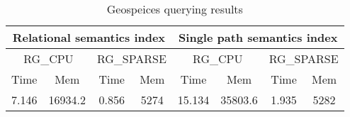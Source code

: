 {\setlength{\tabcolsep}{0.4em}
\begin{table*}[h]
\caption{Geospeices querying results}
\label{tbl:tableGeoRelationalPathIndex}
\begin{tabular}{| c  c | c  c | c  c | c  c |}
    \hline
    
    \multicolumn{4}{|c|}{Relational semantics index}	&	\multicolumn{4}{|c|}{Single path semantics index} \\    
    
    \hline
    
    
    \multicolumn{2}{|c|}{RG\_CPU}	&	\multicolumn{2}{|c|}{RG\_SPARSE} & \multicolumn{2}{|c|}{RG\_CPU}	&	\multicolumn{2}{|c|}{RG\_SPARSE}	 \\
     Time & Mem & Time & Mem & Time & Mem & Time & Mem \\    
    \hline
    \hline
    7.146 & 16934.2 & 0.856 & 5274 & 15.134 & 35803.6 & 1.935 & 5282   \\
    \hline
  \end{tabular}
\end{table*}
}

